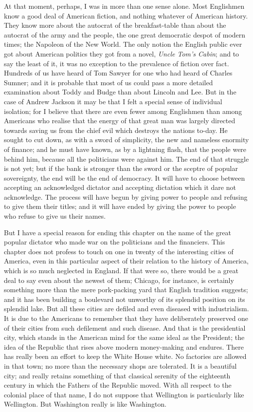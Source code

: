\documentclass{book}
\begin{document}
At that moment, perhaps, I was in more than one sense alone. Most Englishmen know a good deal of American fiction, and nothing whatever of American history. They know more about the autocrat of the breakfast-table than about the autocrat of the army and the people, the one great democratic despot of modern times; the Napoleon of the New World. The only notion the English public ever got about American politics they got from a novel, \emph{Uncle Tom’s Cabin}; and to say the least of it, it was no exception to the prevalence of fiction over fact. Hundreds of us have heard of Tom Sawyer for one who had heard of Charles Sumner; and it is probable that most of us could pass a more detailed examination about Toddy and Budge than about Lincoln and Lee. But in the case of Andrew Jackson it may be that I felt a special sense of individual isolation; for I believe that there are even fewer among Englishmen than among Americans who realise that the energy of that great man was largely directed towards saving us from the chief evil which destroys the nations to-day. He sought to cut down, as with a sword of simplicity, the new and nameless enormity of finance; and he must have known, as by a lightning flash, that the people were behind him, because all the politicians were against him. The end of that struggle is not yet; but if the bank is stronger than the sword or the sceptre of popular sovereignty, the end will be the end of democracy. It will have to choose between accepting an acknowledged dictator and accepting dictation which it dare not acknowledge. The process will have begun by giving power to people and refusing to give them their titles; and it will have ended by giving the power to people who refuse to give us their names.

But I have a special reason for ending this chapter on the name of the great popular dictator who made war on the politicians and the financiers. This chapter does not profess to touch on one in twenty of the interesting cities of America, even in this particular aspect of their relation to the history of America, which is so much neglected in England. If that were so, there would be a great deal to say even about the newest of them; Chicago, for instance, is certainly something more than the mere pork-packing yard that English tradition suggests; and it has been building a boulevard not unworthy of its splendid position on its splendid lake. But all these cities are defiled and even diseased with industrialism. It is due to the Americans to remember that they have deliberately preserved one of their cities from such defilement and such disease. And that is the presidential city, which stands in the American mind for the same ideal as the President; the idea of the Republic that rises above modern money-making and endures. There has really been an effort to keep the White House white. No factories are allowed in that town; no more than the necessary shops are tolerated. It is a beautiful city; and really retains something of that classical serenity of the eighteenth century in which the Fathers of the Republic moved. With all respect to the colonial place of that name, I do not suppose that Wellington is particularly like Wellington. But Washington really is like Washington.
\end{document}
